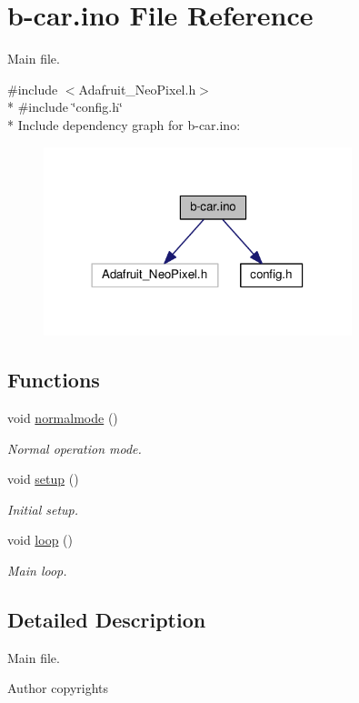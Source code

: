 \hypertarget{b-car_8ino}{}\section{b-\/car.ino File Reference}
\label{b-car_8ino}


Main file.  


{\ttfamily \#include $<$Adafruit\+\_\+\+Neo\+Pixel.\+h$>$}\\*
{\ttfamily \#include \char`\"{}config.\+h\char`\"{}}\\*
Include dependency graph for b-\/car.ino\+:\nopagebreak
\begin{figure}[H]
\begin{center}
\leavevmode
\includegraphics[width=254pt]{b-car_8ino__incl}
\end{center}
\end{figure}
\subsection*{Functions}
\begin{DoxyCompactItemize}
\item 
void \hyperlink{group__car_gaa0a39b0689218537e29a29f9c3f2af47}{normalmode} ()
\begin{DoxyCompactList}\small\item\em Normal operation mode. \end{DoxyCompactList}\end{DoxyCompactItemize}
{\bf }\par
\begin{DoxyCompactItemize}
\item 
void \hyperlink{group__main_ga4fc01d736fe50cf5b977f755b675f11d}{setup} ()
\begin{DoxyCompactList}\small\item\em Initial setup. \end{DoxyCompactList}\item 
void \hyperlink{group__main_gafe461d27b9c48d5921c00d521181f12f}{loop} ()
\begin{DoxyCompactList}\small\item\em Main loop. \end{DoxyCompactList}\end{DoxyCompactItemize}



\subsection{Detailed Description}
Main file. 

\begin{DoxyAuthor}{Author}
copyrights 
\end{DoxyAuthor}
